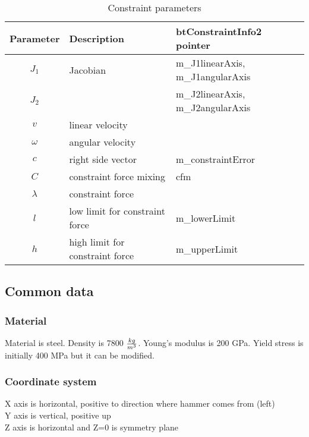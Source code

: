 \begin {table}[htb!]
\begin{center}
\begin{tabular}{|c| l| l|}
\hline
{\bf Parameter} & {\bf Description} & {\bf btConstraintInfo2 pointer}\\  \hline
$J_1$ & Jacobian & m\_J1linearAxis, m\_J1angularAxis \\ 
$J_2$ & & m\_J2linearAxis, m\_J2angularAxis \\ \hline
$v$ & linear velocity & \\ \hline
$\omega$ & angular velocity & \\ \hline
$c$        &  right side vector   & m\_constraintError \\ \hline
$C$  & constraint force mixing & cfm \\  \hline
$\lambda$ & constraint force &  \\ \hline
$l$ & low limit for constraint force & m\_lowerLimit \\ \hline
$h$ & high limit for constraint force & m\_upperLimit \\ \hline
\end {tabular}
\end{center}
\caption {Constraint parameters} \label{tab:constraintParameters} 
\end {table}

\subsection{Common data}

\subsubsection{Material}

Material is steel. Density is 7800 $kg\over{m^{3}}$. Young’s modulus is 200 GPa. Yield stress is initially 400 MPa but it can be modified.

\subsubsection{Coordinate system}

X axis is horizontal, positive to direction where hammer comes from (left)\\
Y axis is vertical, positive up\\
Z axis is horizontal and Z=0 is symmetry plane

